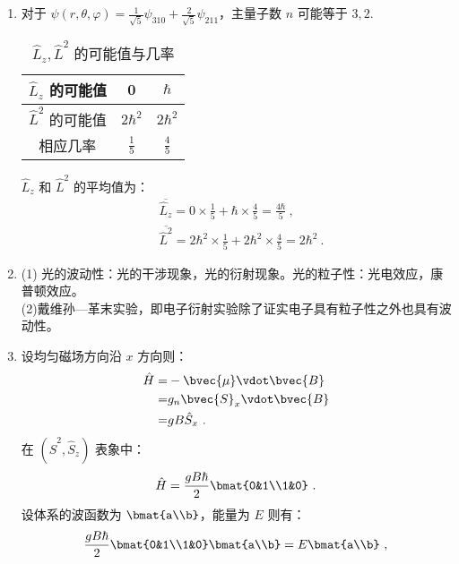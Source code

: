
\begin{issues}
\issueTODO
\issueDraft
\end{issues}

\subsection{ }
\begin{enumerate}
\item 对于 $\psi(r,\theta,\varphi) = \frac{1}{\sqrt{5}}\psi_{310} + \frac{2}{\sqrt{5}}\psi_{211} $，主量子数 $n$ 可能等于 $3,2$.\\
\begin{table}[ht]
\centering
\caption{$\hat{L}_{z},\hat{L}^{2}$ 的可能值与几率}\label{tab_TJU14A_1}
\begin{tabular}{|c|c|c|}
\hline
$\hat{L}_z$ 的可能值 & 0 & $\hbar$  \\
\hline
$\hat{L}^2$ 的可能值 & $2\hbar^{2}$ & $2\hbar^{2}$  \\
\hline
相应几率 & $\frac{1}{5}$ & $\frac{4}{5}$  \\
\hline
\end{tabular}
\end{table}
$\hat{L}_{z}$ 和 $\hat{L}^{2}$ 的平均值为：\\
\begin{align}\label{eq_TJU14A_1}
& \overline{\hat{L}_{z}} = 0 \times \frac{1}{5} + \hbar \times \frac{4}{5} = \frac{4\hbar}{5} ~,\\
& \overline{\hat{L}^{2}} = 2\hbar^{2} \times \frac{1}{5} + 2\hbar^{2} \times \frac{4}{5} = 2\hbar^{2}~.
\end{align}
\item (1) 光的波动性：光的干涉现象，光的衍射现象。光的粒子性：光电效应，康普顿效应。\\
(2)戴维孙—革末实验，即电子衍射实验除了证实电子具有粒子性之外也具有波动性。
\item 设均匀磁场方向沿 $x$ 方向则：
\begin{equation}
\begin{aligned}
\hat{H}=& -\bvec{\mu}\vdot \bvec{B} \\
=& g_{n}\bvec{S}_{x}\vdot \bvec{B} \\
=& gB\hat{S}_{x}~.
\end{aligned}
\end{equation}
在 $(\hat{S}^{2},\hat{S}_{z})$ 表象中：
\begin{equation}
\hat{H}=\frac{gB\hbar}{2}\bmat{0&1\\1&0}~.
\end{equation}
设体系的波函数为 $\bmat{a\\b}$，能量为 $E$ 则有：
\begin{equation}
\frac{gB\hbar}{2}\bmat{0&1\\1&0}\bmat{a\\b}=E\bmat{a\\b}~,
\end{equation}


\end{enumerate}
